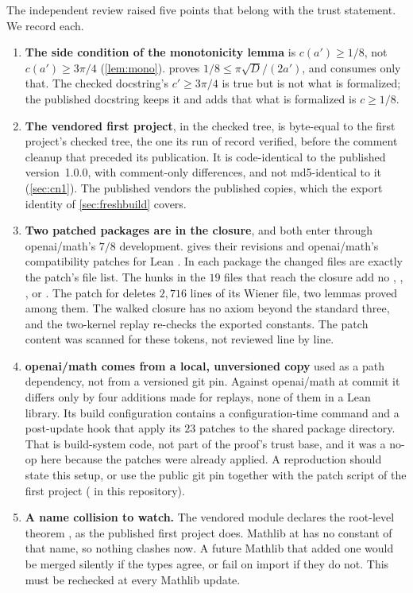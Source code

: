 \documentclass[11pt]{article}
\theoremstyle{definition}
\begin{document}
{The independent review raised five points that belong with the trust statement. We record each.
\begin{enumerate}[label=(\roman*),nosep]
\item \textbf{The side condition of the monotonicity lemma} is $c(a') \ge 1/8$, not $c(a') \ge 3\pi/4$ (\cref{lem:mono}).  proves $1/8 \le \pi\sqrt D/(2a')$, and  consumes only that. The checked docstring's $c' \ge 3\pi/4$ is true but is not what is formalized; the published docstring keeps it and adds that what is formalized is $c \ge 1/8$.
\item \textbf{The vendored first project}, in the checked tree, is byte-equal to the first project's checked tree, the one its run of record verified, before the comment cleanup that preceded its publication. It is code-identical to the published version~1.0.0, with comment-only differences, and not md5-identical to it (\cref{sec:cn1}). The published  vendors the published  copies, which the export identity of \cref{sec:freshbuild} covers.
\item \textbf{Two patched packages are in the closure}, and both enter through openai/math's $7/8$ development.  gives their revisions and openai/math's compatibility patches for Lean .
In each package the changed files are exactly the patch's file list. The hunks in the $19$ files that reach the closure add no , , ,  or . The patch for  deletes $2{,}716$ lines of its Wiener file, two lemmas proved  among them. The walked closure has no axiom beyond the standard three, and the two-kernel replay re-checks the exported constants. The patch content was scanned for these tokens, not reviewed line by line.
\item \textbf{openai/math comes from a local, unversioned copy} used as a path dependency, not from a versioned git pin. Against openai/math at commit  it differs only by four additions made for replays, none of them in a Lean library. Its build configuration contains a configuration-time command and a post-update hook that apply its $23$ patches to the shared package directory. That is build-system code, not part of the proof's trust base, and it was a no-op here because the patches were already applied. A reproduction should state this setup, or use the public git pin together with the patch script of the first project ( in this repository).
\item \textbf{A name collision to watch.} The vendored module  declares the root-level theorem , as the published first project does. Mathlib at  has no constant of that name, so nothing clashes now. A future Mathlib that added one would be merged silently if the types agree, or fail on import if they do not. This must be rechecked at every Mathlib update.
\end{enumerate}

}
\end{document}
